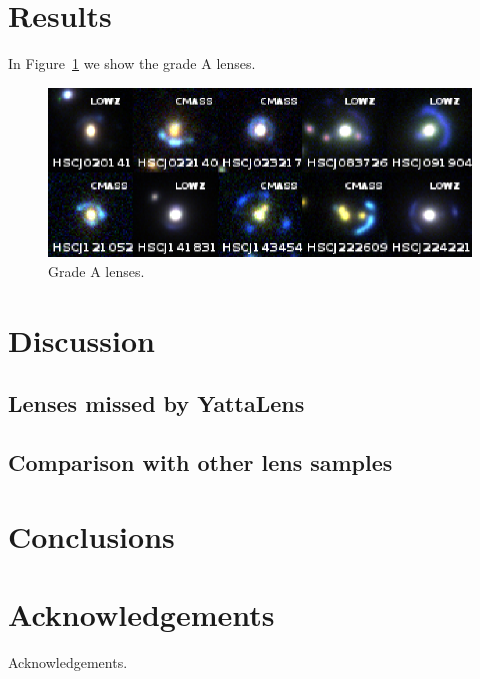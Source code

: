 \documentclass[a4paper,fleqn,usenatbib]{mnras}
\def\Fref#1{Figure~\ref{#1}\xspace}
\begin{document}
\section{Results}
In \Fref{fig:gradeA} we show the grade A lenses.
%
\begin{figure}
 \includegraphics[width=\textwidth]{gradeA_collage.eps}
 \caption{Grade A lenses.}
 \label{fig:gradeA}
\end{figure}
%
\section{Discussion}

\subsection{Lenses missed by YattaLens}

\subsection{Comparison with other lens samples}

\section{Conclusions}

\section*{Acknowledgements}

Acknowledgements.




%
\end{document}
